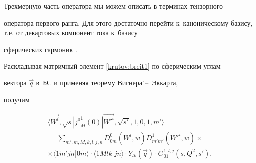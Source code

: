 Трехмерную часть оператора мы можем описать в терминах тензорного

оператора первого ранга. Для этого достаточно перейти к~каноническому базису, т.е. от декартовых компонент тока к~базису

сферических гармоник \cite{Edmons58}.


















Раскладывая матричный элемент \eqref{krutov:breit1} по сферическим углам

вектора $\vec{q}$ в~БС и применяя теорему Вигнера"--~Эккарта,

получим

\begin{multline}\label{krutov:Atok}

\langle\vec{W^{i}},\sqrt{s}|{j^0}^{1}_M(0)|\vec{W'^{i}},\sqrt{s'}, 1, 0, 1, m'\rangle=

\\

=

\sum_{\tilde{m}', \tilde{m}, M,k,l,j,n}D^{0}_{0 \tilde{m}}(W^{i},w)

D^{1}_{m'\tilde{m}'}(W'^{i},w)

\times \\

\times \langle 1\tilde{m}' j n |0

\tilde{m}\rangle \cdot \langle 1 M l k |j

n\rangle \cdot Y_{l k}(\vec{q})\cdot

G^{1,l,j}_{01}(s,Q^2,s').

\end{multline}



